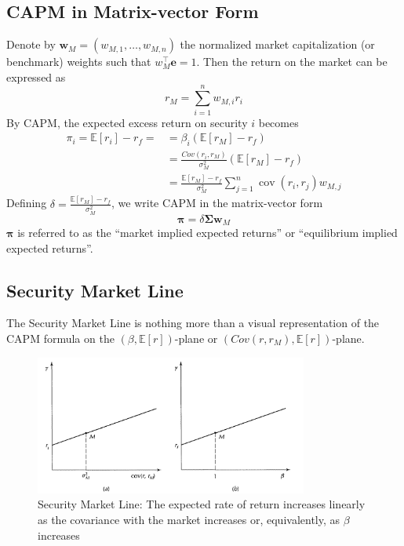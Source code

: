 \documentclass[13pt]{article}
\theoremstyle{definition}
\theoremstyle{remark}
\newenvironment{remark}
  {\pushQED{\qed}\renewcommand{\qedsymbol}{$\triangle$}\remarkx}
  {\popQED\endremarkx}
\newcommand{\EE}{\mathbb{E}}
\begin{document}
\subsection{CAPM in Matrix-vector Form}\label{sec:CAPM in Matrix-vector Form}
Denote by $\bm{w}_{M}=\left(w_{M, 1}, \ldots, w_{M, n}\right)$ the normalized market capitalization (or benchmark) weights such that $w_{M}^{\top} \bm{e}=1$. Then the return on the market can be expressed as
$$
r_{M}=\sum_{i=1}^{n} w_{M, i} r_{i}
$$
By CAPM, the expected excess return on security $i$ becomes
$$
\begin{aligned}
\pi_{i} = \EE[r_i]-r_f = & =\beta_{i}\left(\mathbb{E}\left[r_{M}\right]-r_{f}\right) \\
& =\frac{Cov\left(r_{i}, r_{M}\right)}{\sigma_{M}^{2}}\left(\mathbb{E}\left[r_{M}\right]-r_{f}\right) \\
& =\frac{\mathbb{E}\left[r_{M}\right]-r_{f}}{\sigma_{M}^{2}} \sum_{j=1}^{n} \operatorname{cov}\left(r_{i}, r_{j}\right) w_{M, j}
\end{aligned}
$$
Defining $\delta=\frac{\mathbb{E}\left[r_{M}\right]-r_{f}}{\sigma_{M}^{2}}$, we write CAPM in the matrix-vector form
$$
\bm{\pi}=\delta \mathbf{\Sigma} \bm{w}_{M}
$$
\begin{remark}
    $\bm{\pi}$ is referred to as the ``market implied expected returns'' or ``equilibrium implied expected returns''.
\end{remark}


\subsection{Security Market Line}
The Security Market Line is nothing more than a visual representation of the CAPM formula on the $(\beta, \EE[r])$-plane or $(Cov(r,r_M), \EE[r])$-plane. 

\begin{figure}[!htp]
    \centering
    \includegraphics[width=0.8\textwidth]{security market line.png}
    \caption{Security Market Line: The expected rate of return increases linearly as the covariance with the market
increases or, equivalently, as $\beta$ increases}
    \label{fig:security market line}
\end{figure}
\end{document}
